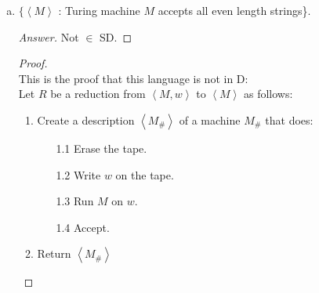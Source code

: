 \documentclass[10pt]{article}
\newcommand{\brackets}[1]{\left< #1 \right>}
\begin{document}
\begin{enumerate}[1)]
\begin{enumerate}[a)]
\begin{proof}[Proof]
\begin{enumerate}[1.]
\begin{enumerate}
\item[1.2]
Write $w$ on the tape.

\item[1.3]
Run $M$ on $w$.

\item[1.4]
Accept.
\end{enumerate}
\item
Return $\brackets{M_\#, \epsilon, \epsilon}$
\end{enumerate}


Assume by way of contradiction that there exists some machine $Oracle(\brackets{M, x, y})$ that decides whether $M$ accepts $xy$.  Then for any machine description string pair $\brackets{M, w}$ let $C = oracle(R(\brackets{M, w}))$. Now there are two cases:\\

If $\brackets{M, w} \in$ H: $M_\#$ accepts all strings, so it accepts $xy$.  Oracle accepts.\\
If $\brackets{M, w} \not \in$ H: $M_\#$ accepts no strings, so it does not accept $xy$.  Oracle rejects.\\

So $C$ decides H.  Therefore $Oracle$ does not exist.
\end{proof}

\pagebreak
\item
$\{\brackets{M}$ : Turing machine $M$ accepts all even length strings\}.
\begin{proof}[Answer]
Not $\in$ SD.
\end{proof}
\begin{proof}[Proof]$ $\\
This is the proof that this language is not in D:\\

Let $R$ be a reduction from $\brackets{M, w}$ to $\brackets{M}$ as follows:
\begin{enumerate}[1.]
\item
Create a description $\brackets{M_\#}$ of a machine $M_\#$ that does:
\begin{enumerate}
\item[1.1]
Erase the tape.

\item[1.2]
Write $w$ on the tape.

\item[1.3]
Run $M$ on $w$.

\item[1.4]
Accept.
\end{enumerate}
\item
Return $\brackets{M_\#}$
\end{enumerate}


\end{proof}
\end{enumerate}
\end{enumerate}
\end{document}
